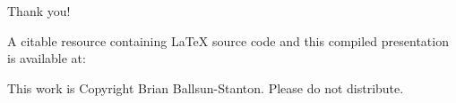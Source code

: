 \documentclass[aspectratio=1610, 11pt]{beamer} %
\begin{document}



  


\begin{frame}{Thank you!}


A citable resource containing \LaTeX{} source code and this compiled presentation is available at: 

This work is Copyright Brian Ballsun-Stanton. Please do not distribute.

\end{frame}
\end{document}
